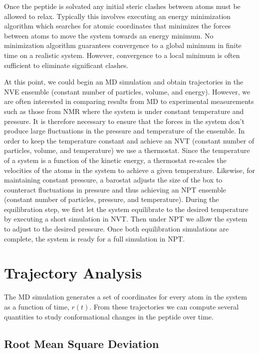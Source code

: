 Once the peptide is solvated any initial steric clashes between atoms must be allowed to relax. Typically this involves executing an energy minimization algorithm which searches for atomic coordinates that minimizes the forces between atoms to move the system towards an energy minimum. No minimization algorithm guarantees convergence to a global minimum in finite time on a realistic system. However, convergence to a local minimum is often sufficient to eliminate significant clashes. 

At this point, we could begin an MD simulation and obtain trajectories in the NVE ensemble (constant number of particles, volume, and energy). However, we are often interested in comparing results from MD to experimental measurements such as those from NMR where the system is under constant temperature and pressure. It is therefore necessary to ensure that the forces in the system don't produce large fluctuations in the pressure and temperature of the ensemble. In order to keep the temperature constant and achieve an NVT (constant number of particles, volume, and temperature) we use a thermostat. Since the temperature of a system is a function of the kinetic energy, a thermostat re-scales the velocities of the atoms in the system to achieve a given temperature. Likewise, for maintaining constant pressure, a barostat adjusts the size of the box to counteract fluctuations in pressure and thus achieving an NPT ensemble (constant number of particles, pressure, and temperature). During the equilibration step, we first let the system equilibrate to the desired temperature by executing a short simulation in NVT. Then under NPT we allow the system to adjust to the desired pressure. Once both equilibration simulations are complete, the system is ready for a full simulation in NPT. 

\section{Trajectory Analysis}

The MD simulation generates a set of coordinates for every atom in the system as a function of time, $r(t)$. From these trajectories we can compute several quantities to study conformational changes in the peptide over time. 

\subsection{Root Mean Square Deviation}

